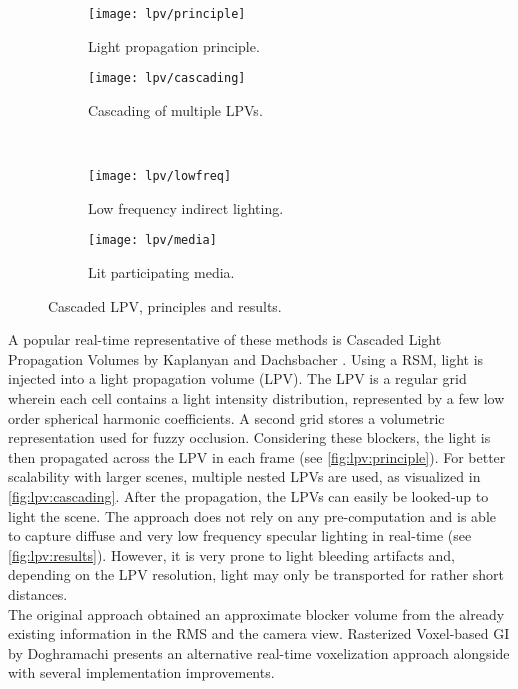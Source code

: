 \documentclass[thesis.tex]{subfiles}
\begin{document}
\begin{figure}[h]
\centering
\begin{subfigure}[b]{0.35\textwidth}
\centering
\texttt{[image: lpv/principle]}
\caption{Light propagation principle.}
\label{fig:lpv:principle}
\end{subfigure}
\begin{subfigure}[b]{0.53\textwidth}
\centering
\texttt{[image: lpv/cascading]}
\caption{Cascading of multiple LPVs.}
\label{fig:lpv:cascading}
\end{subfigure}
\\
\begin{subfigure}[b]{0.48\textwidth}
\centering
\texttt{[image: lpv/lowfreq]}
\caption{Low frequency indirect lighting.}
\label{fig:lpv:results}
\end{subfigure}
\begin{subfigure}[b]{0.48\textwidth}
\centering
\texttt{[image: lpv/media]}
\caption{Lit participating media.}
\end{subfigure}
\caption{\cite{bib:lpt} Cascaded LPV, principles and results.}
\end{figure}
A popular real-time representative of these methods is Cascaded Light Propagation Volumes by Kaplanyan and Dachsbacher \cite{bib:lpt}.
Using a RSM, light is injected into a light propagation volume (LPV).
The LPV is a regular grid wherein each cell contains a light intensity distribution, represented by a few low order spherical harmonic coefficients.
A second grid stores a volumetric representation used for fuzzy occlusion.
Considering these blockers, the light is then propagated across the LPV in each frame (see \autoref{fig:lpv:principle}).
For better scalability with larger scenes, multiple nested LPVs are used, as visualized in \autoref{fig:lpv:cascading}.
After the propagation, the LPVs can easily be looked-up to light the scene.
The approach does not rely on any pre-computation and is able to capture diffuse and very low frequency specular lighting in real-time (see \autoref{fig:lpv:results}).
However, it is very prone to light bleeding artifacts and, depending on the LPV resolution, light may only be transported for rather short distances.
\\
The original approach obtained an approximate blocker volume from the already existing information in the RMS and the camera view.
Rasterized Voxel-based GI by Doghramachi \cite{bib:rasterizedvbgi} presents an alternative real-time voxelization approach alongside with several implementation improvements.
\end{document}
